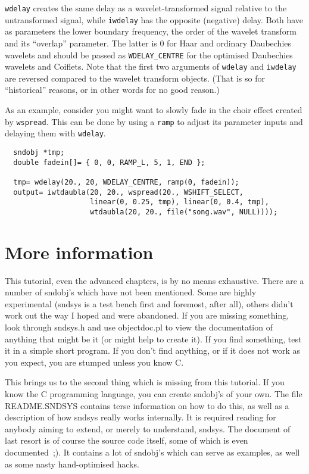 \documentclass{article}
\def\s{{\sc sndsys} }
\def\sn{{\sc sndsys}}
\def\bv{\begin{verbatim}}
\begin{document}
{\tt wdelay} creates the same delay as a wavelet-transformed signal relative to
the untransformed signal, while {\tt iwdelay} has the opposite (negative)
delay.  Both have as parameters the lower boundary frequency, the order of the
wavelet transform and its ``overlap'' parameter.  The latter is 0 for Haar and
ordinary Daubechies wavelets and should be passed as {\tt WDELAY\_CENTRE} for
the optimised Daubechies wavelets and Coiflets.  Note that the first two
arguments of {\tt wdelay} and {\tt iwdelay} are reversed compared to the
wavelet transform objects.  (That is so for ``historical'' reasons, or in other
words for no good reason.)  

As an example, consider you might want to slowly fade in the choir effect
created by {\tt wspread}.  This can be done by using a {\tt ramp} to adjust its
parameter inputs and delaying them with {\tt wdelay}.

\bv
  sndobj *tmp;
  double fadein[]= { 0, 0, RAMP_L, 5, 1, END };

  tmp= wdelay(20., 20, WDELAY_CENTRE, ramp(0, fadein));
  output= iwtdaubla(20, 20., wspread(20., WSHIFT_SELECT, 
                    linear(0, 0.25, tmp), linear(0, 0.4, tmp), 
                    wtdaubla(20, 20., file("song.wav", NULL))));
\end{verbatim}



\section{More information}
\label{sec:internals}

This tutorial, even the advanced chapters, is by no means exhaustive.  There
are a number of sndobj's which have not been mentioned.  Some are highly
experimental (\s is a test bench first and foremost, after all), others didn't
work out the way I hoped and were abandoned.  If you are missing something,
look through sndsys.h and use objectdoc.pl to view the documentation of
anything that might be it (or might help to create it).  If you find something,
test it in a simple short program.  If you don't find anything, or if it does
not work as you expect, you are stumped unless you know C.

This brings us to the second thing which is missing from this tutorial.  If you
know the C programming language, you can create sndobj's of your own.  The file
README.SNDSYS contains terse information on how to do this, as well as a
description of how \s really works internally.  It is required reading for
anybody aiming to extend, or merely to understand, \sn.  The document of last
resort is of course the source code itself, some of which is even documented~;).
It contains a lot of sndobj's which can serve as examples, as well as some
nasty hand-optimised hacks.
\end{document}
